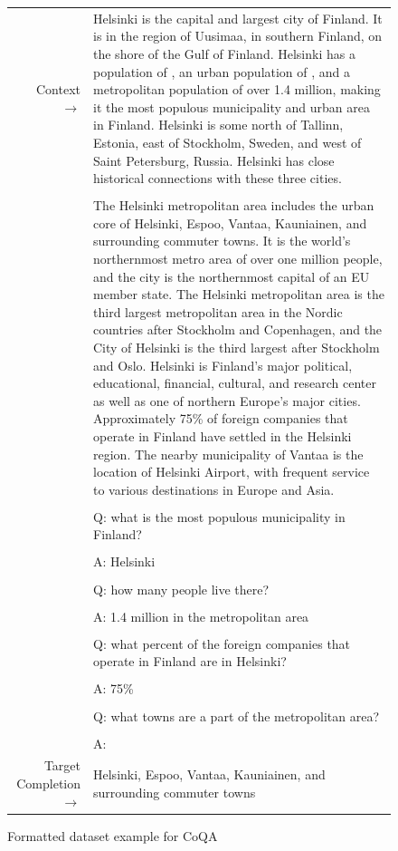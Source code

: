 \begin{figure} { \tt \footnotesize \begin{tabularx}{\linewidth}{r X} \toprule Context $\to$ & Helsinki is the capital and largest city of Finland. It is in the region of Uusimaa, in southern Finland, on the shore of the Gulf of Finland. Helsinki has a population of , an urban population of , and a metropolitan population of over 1.4 million, making it the most populous municipality and urban area in Finland. Helsinki is some north of Tallinn, Estonia, east of Stockholm, Sweden, and west of Saint Petersburg, Russia. Helsinki has close historical connections with these three cities. \\
 &  \\ 
 & The Helsinki metropolitan area includes the urban core of Helsinki, Espoo, Vantaa, Kauniainen, and surrounding commuter towns. It is the world's northernmost metro area of over one million people, and the city is the northernmost capital of an EU member state. The Helsinki metropolitan area is the third largest metropolitan area in the Nordic countries after Stockholm and Copenhagen, and the City of Helsinki is the third largest after Stockholm and Oslo. Helsinki is Finland's major political, educational, financial, cultural, and research center as well as one of northern Europe's major cities. Approximately 75\% of foreign companies that operate in Finland have settled in the Helsinki region. The nearby municipality of Vantaa is the location of Helsinki Airport, with frequent service to various destinations in Europe and Asia. \\ 
 &  \\ 
 & Q: what is the most populous municipality in Finland? \\ 
 &  \\ 
 & A: Helsinki \\ 
 &  \\ 
 & Q: how many people live there? \\ 
 &  \\ 
 & A: 1.4 million in the metropolitan area \\ 
 &  \\ 
 & Q: what percent of the foreign companies that operate in Finland are in Helsinki? \\ 
 &  \\ 
 & A: 75\% \\ 
 &  \\ 
 & Q: what towns are a part of the metropolitan area? \\ 
 &  \\ 
 & A: \\ 
 \midrule Target Completion $\to$ & Helsinki, Espoo, Vantaa, Kauniainen, and surrounding commuter towns \\
\bottomrule \end{tabularx} }  \caption{Formatted dataset example for CoQA}  \label{eval:CoQA}  \end{figure}%




